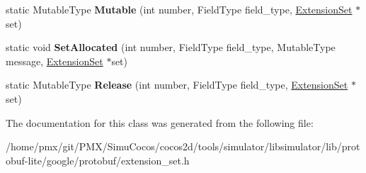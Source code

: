 \begin{DoxyCompactItemize}
static Mutable\+Type {\bfseries Mutable} (int number, Field\+Type field\+\_\+type, \hyperlink{classgoogle_1_1protobuf_1_1internal_1_1ExtensionSet}{Extension\+Set} $\ast$set)
\item 
\mbox{\label{classgoogle_1_1protobuf_1_1internal_1_1MessageTypeTraits_a4f763f4756953da44aed8228d705f0e4}} 
static void {\bfseries Set\+Allocated} (int number, Field\+Type field\+\_\+type, Mutable\+Type message, \hyperlink{classgoogle_1_1protobuf_1_1internal_1_1ExtensionSet}{Extension\+Set} $\ast$set)
\item 
\mbox{\label{classgoogle_1_1protobuf_1_1internal_1_1MessageTypeTraits_a2f7624a77c06c545fbc323fd88018e95}} 
static Mutable\+Type {\bfseries Release} (int number, Field\+Type field\+\_\+type, \hyperlink{classgoogle_1_1protobuf_1_1internal_1_1ExtensionSet}{Extension\+Set} $\ast$set)
\end{DoxyCompactItemize}


The documentation for this class was generated from the following file\+:\begin{DoxyCompactItemize}
\item 
/home/pmx/git/\+P\+M\+X/\+Simu\+Cocos/cocos2d/tools/simulator/libsimulator/lib/protobuf-\/lite/google/protobuf/extension\+\_\+set.\+h\end{DoxyCompactItemize}
